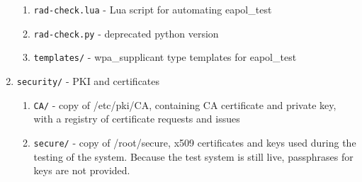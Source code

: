 \begin{enumerate}
\begin{enumerate}
 \item\texttt{rad-check.lua} - Lua script for automating eapol\_test
 \item\texttt{rad-check.py} - deprecated python version
 \item\texttt{templates/} - wpa\_supplicant type templates for eapol\_test
\end{enumerate}
\item\texttt{security/} - PKI and certificates
\begin{enumerate}
 \item\texttt{CA/} - copy of /etc/pki/CA, containing CA certificate and private key,
                with a registry of certificate requests and issues 
 \item\texttt{secure/} - copy of /root/secure, x509 certificates and keys used during
                the testing of the system. Because the test system is still
                live, passphrases for keys are not provided.
\end{enumerate}
\end{enumerate}
